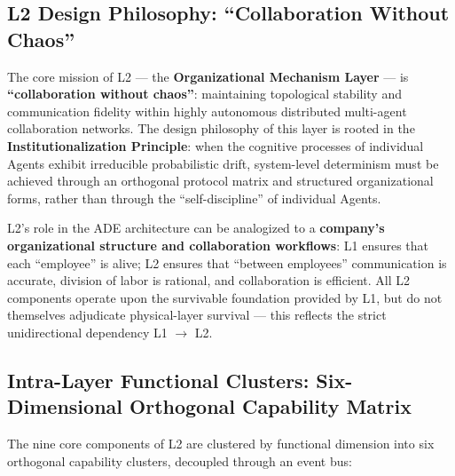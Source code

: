 \documentclass[11pt,a4paper]{article}
\begin{document}
\subsection{L2 Design Philosophy: ``Collaboration Without Chaos''}

The core mission of L2 --- the \textbf{Organizational Mechanism Layer} --- is \textbf{``collaboration without chaos''}: maintaining topological stability and communication fidelity within highly autonomous distributed multi-agent collaboration networks. The design philosophy of this layer is rooted in the \textbf{Institutionalization Principle}: when the cognitive processes of individual Agents exhibit irreducible probabilistic drift, system-level determinism must be achieved through an orthogonal protocol matrix and structured organizational forms, rather than through the ``self-discipline'' of individual Agents.

L2's role in the ADE architecture can be analogized to a \textbf{company's organizational structure and collaboration workflows}: L1 ensures that each ``employee'' is alive; L2 ensures that ``between employees'' communication is accurate, division of labor is rational, and collaboration is efficient. All L2 components operate upon the survivable foundation provided by L1, but do not themselves adjudicate physical-layer survival --- this reflects the strict unidirectional dependency L1 $\rightarrow$ L2.

\subsection{Intra-Layer Functional Clusters: Six-Dimensional Orthogonal Capability Matrix}

The nine core components of L2 are clustered by functional dimension into six orthogonal capability clusters, decoupled through an event bus:
\end{document}
